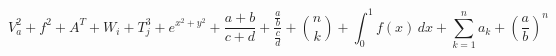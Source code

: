 \[ V_a^2+f^2+A^T+W_i+T_j^3+e^{x^2+y^2}+\frac{a+b}{c+d}+\frac{\frac{a}{b}}{\frac{c}{d}}
   +\binom{n}{k}+\int_0^1 f(x)\,dx+\sum_{k=1}^n a_k+\left(\frac{a}{b}\right)^n \]
